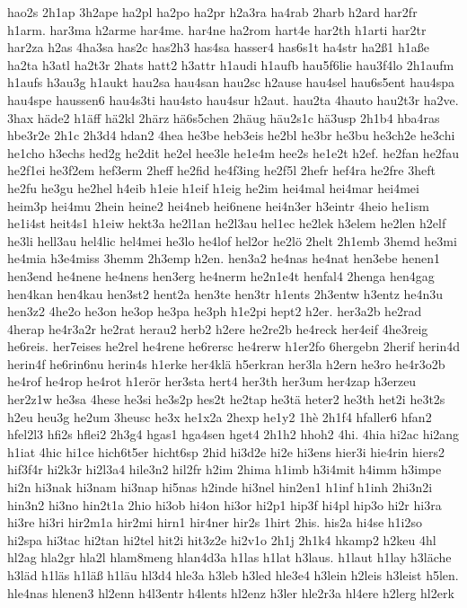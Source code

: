 {hao2s
2h1ap
3h2ape
ha2pl
ha2po
ha2pr
h2a3ra
ha4rab
2harb
h2ard
har2fr
h1arm.
har3ma
h2arme
har4me.
har4ne
ha2rom
hart4e
har2th
h1arti
har2tr
har2za
h2as
4ha3sa
has2c
has2h3
has4sa
hasser4
has6s1t
ha4str
ha2ß1
h1aße
ha2ta
h3atl
ha2t3r
2hats
hatt2
h3attr
h1audi
h1aufb
hau5f6lie
hau3f4lo
2h1aufm
h1aufs
h3au3g
h1aukt
hau2sa
hau4san
hau2sc
h2ause
hau4sel
hau6s5ent
hau4spa
hau4spe
haussen6
hau4s3ti
hau4sto
hau4sur
h2aut.
hau2ta
4hauto
hau2t3r
ha2ve.
3hax
häde2
h1äff
hä2kl
2härz
hä6s5chen
2häug
häu2s1c
hä3usp
2h1b4
hba4ras
hbe3r2e
2h1c
2h3d4
hdan2
4hea
he3be
heb3eis
he2bl
he3br
he3bu
he3ch2e
he3chi
he1cho
h3echs
hed2g
he2dit
he2el
hee3le
he1e4m
hee2s
he1e2t
h2ef.
he2fan
he2fau
he2f1ei
he3f2em
hef3erm
2heff
he2fid
he4f3ing
he2f5l
2hefr
hef4ra
he2fre
3heft
he2fu
he3gu
he2hel
h4eib
h1eie
h1eif
h1eig
he2im
hei4mal
hei4mar
hei4mei
heim3p
hei4mu
2hein
heine2
hei4neb
hei6nene
hei4n3er
h3eintr
4heio
he1ism
he1i4st
heit4s1
h1eiw
hekt3a
he2l1an
he2l3au
hel1ec
he2lek
h3elem
he2len
h2elf
he3li
hell3au
hel4lic
hel4mei
he3lo
he4lof
hel2or
he2lö
2helt
2h1emb
3hemd
he3mi
he4mia
h3e4miss
3hemm
2h3emp
h2en.
hen3a2
he4nas
he4nat
hen3ebe
henen1
hen3end
he4nene
he4nens
hen3erg
he4nerm
he2n1e4t
henfal4
2henga
hen4gag
hen4kan
hen4kau
hen3st2
hent2a
hen3te
hen3tr
h1ents
2h3entw
h3entz
he4n3u
hen3z2
4he2o
he3on
he3op
he3pa
he3ph
h1e2pi
hept2
h2er.
her3a2b
he2rad
4herap
he4r3a2r
he2rat
herau2
herb2
h2ere
he2re2b
he4reck
her4eif
4he3reig
he6reis.
her7eises
he2rel
he4rene
he6rersc
he4rerw
h1er2fo
6hergebn
2herif
herin4d
herin4f
he6rin6nu
herin4s
h1erke
her4klä
h5erkran
her3la
h2ern
he3ro
he4r3o2b
he4rof
he4rop
he4rot
h1erör
her3sta
hert4
her3th
her3um
her4zap
h3erzeu
her2z1w
he3sa
4hese
he3si
he3s2p
hes2t
he2tap
he3tä
heter2
he3th
het2i
he3t2s
h2eu
heu3g
he2um
3heusc
he3x
he1x2a
2hexp
he1y2
1hè
2h1f4
hfaller6
hfan2
hfel2l3
hfi2s
hflei2
2h3g4
hgas1
hga4sen
hget4
2h1h2
hhoh2
4hi.
4hia
hi2ac
hi2ang
h1iat
4hic
hi1ce
hich6t5er
hicht6sp
2hid
hi3d2e
hi2e
hi3ens
hier3i
hie4rin
hiers2
hif3f4r
hi2k3r
hi2l3a4
hile3n2
hil2fr
h2im
2hima
h1imb
h3i4mit
h4imm
h3impe
hi2n
hi3nak
hi3nam
hi3nap
hi5nas
h2inde
hi3nel
hin2en1
h1inf
h1inh
2hi3n2i
hin3n2
hi3no
hin2t1a
2hio
hi3ob
hi4on
hi3or
hi2p1
hip3f
hi4pl
hip3o
hi2r
hi3ra
hi3re
hi3ri
hir2m1a
hir2mi
hirn1
hir4ner
hir2s
1hirt
2his.
his2a
hi4se
h1i2so
hi2spa
hi3tac
hi2tan
hi2tel
hit2i
hit3z2e
hi2v1o
2h1j
2h1k4
hkamp2
h2keu
4hl
hl2ag
hla2gr
hla2l
hlam8meng
hlan4d3a
h1las
h1lat
h3laus.
h1laut
h1lay
h3läche
h3läd
h1läs
h1läß
h1läu
hl3d4
hle3a
h3leb
h3led
hle3e4
h3lein
h2leis
h3leist
h5len.
hle4nas
hlenen3
hl2enn
h4l3entr
h4lents
hl2enz
h3ler
hle2r3a
hl4ere
h2lerg
hl2erk
}
